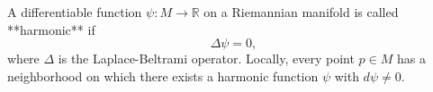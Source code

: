 A differentiable function $\psi: M \to \mathbb{R}$ on a Riemannian manifold is called **harmonic** if
$$\Delta\psi = 0,$$
where $\Delta$ is the Laplace-Beltrami operator. Locally, every point $p \in M$ has a neighborhood on which there exists a harmonic function $\psi$ with $d\psi \neq 0$.